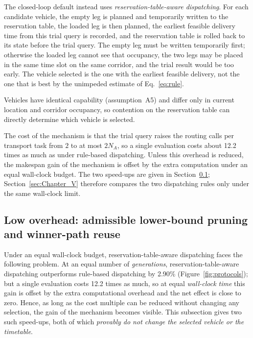 \documentclass[manuscript,screen,review]{acmart}
\newcommand{\CostMultBefore}{12.2}
\newcommand{\GainProbeSameGen}{2.90\%}
\begin{document}
The closed-loop default instead uses \emph{reservation-table-aware dispatching}. For each candidate vehicle, the empty leg is planned and temporarily written to the reservation table, the loaded leg is then planned, the earliest feasible delivery time from this trial query is recorded, and the reservation table is rolled back to its state before the trial query.
The empty leg must be written temporarily first; otherwise the loaded leg cannot see that occupancy, the two legs may be placed in the same time slot on the same corridor, and the trial result would be too early.
The vehicle selected is the one with the earliest feasible delivery, not the one that is best by the unimpeded estimate of Eq.~\eqref{eq:rule}.

Vehicles have identical capability (assumption~A5) and differ only in current location and corridor occupancy, so contention on the reservation table can directly determine which vehicle is selected.

The cost of the mechanism is that the trial query raises the routing calls per transport task from $2$ to at most $2N_A$, so a single evaluation costs about \CostMultBefore{} times as much as under rule-based dispatching.
Unless this overhead is reduced, the makespan gain of the mechanism is offset by the extra computation under an equal wall-clock budget.
The two speed-ups are given in Section~\ref{sec:speedup}; Section~\ref{sec:Chapter_V} therefore compares the two dispatching rules only under the same wall-clock limit.

\subsection{Low overhead: admissible lower-bound pruning and winner-path reuse}
\label{sec:speedup}

Under an equal wall-clock budget, reservation-table-aware dispatching faces the following problem. At an equal number of \emph{generations}, reservation-table-aware dispatching outperforms rule-based dispatching by \GainProbeSameGen{} (Figure~\ref{fig:protocols});
but a single evaluation costs \CostMultBefore{} times as much, so at equal \emph{wall-clock time} this gain is offset by the extra computational overhead and the net effect is close to zero.
Hence, as long as the cost multiple can be reduced without changing any selection, the gain of the mechanism becomes visible. This subsection gives two such speed-ups, both of which \emph{provably do not change the selected vehicle or the timetable}.
\end{document}
